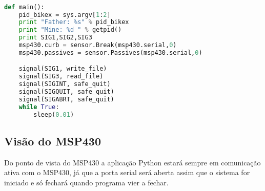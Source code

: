 
\begin{lstlisting}[language=Python,caption={Trecho do código principal}]

def main():
    pid_bikex = sys.argv[1:2]
    print "Father: %s" % pid_bikex
    print "Mine: %d " % getpid()
    print SIG1,SIG2,SIG3
    msp430.curb = sensor.Break(msp430.serial,0)
    msp430.passives = sensor.Passives(msp430.serial,0)

    signal(SIG1, write_file)
    signal(SIG3, read_file)
    signal(SIGINT, safe_quit)
    signal(SIGQUIT, safe_quit)
    signal(SIGABRT, safe_quit)
    while True:
        sleep(0.01)

\end{lstlisting}


\subsection{Visão do MSP430} %
\label{sub:vis_o_do_msp430}

Do ponto de vista do MSP430 a aplicação Python estará sempre em comunicação ativa com o MSP430, já que a porta serial será aberta assim que o sistema for iniciado e só fechará quando programa vier a fechar.
